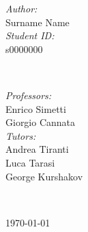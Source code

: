 \begin{titlepage}

\begin{minipage}{0.4\textwidth}
\begin{flushleft} \large
\emph{Author:}\\[0.2cm]
Surname Name %
\\[1.2em]
\emph{Student ID:}\\[0.2cm]
s0000000 \\[1.2em]
\end{flushleft}
\end{minipage}
~
\begin{minipage}{0.4\textwidth}
\begin{flushright} \large
\emph{Professors:} \\[0.2cm]
Enrico Simetti\\
Giorgio Cannata  \\[1.2em] %

\emph{Tutors:} \\[0.2cm]
Andrea Tiranti\\
Luca Tarasi\\
George Kurshakov
\end{flushright}
\end{minipage}\\[2cm]
\makeatother



{\large \today}\\[2cm] %

\vfill %

\end{titlepage}